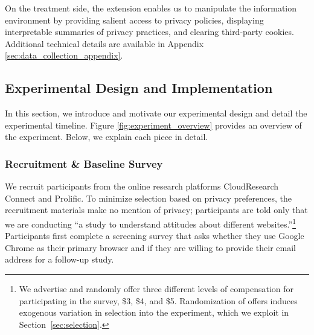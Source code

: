 \documentclass[12pt]{article}
\theoremstyle{definition}
\theoremstyle{remark}
\begin{document}
On the treatment side, the extension enables us to manipulate the information environment by providing salient access to privacy policies, displaying interpretable summaries of privacy practices, and clearing third-party cookies. Additional technical details are available in Appendix \ref{sec:data_collection_appendix}.

\subsection{Experimental Design and Implementation}

In this section, we introduce and motivate our experimental design and detail the experimental timeline. Figure \ref{fig:experiment_overview} provides an overview of the experiment. Below, we explain each piece in detail.

\subsubsection{Recruitment \& Baseline Survey}\label{subsec:recruitment}

We recruit participants from the online research platforms CloudResearch Connect and Prolific. To minimize selection based on privacy preferences, the recruitment materials make no mention of privacy; participants are told only that we are conducting ``a study to understand attitudes about different websites.''\footnote{We advertise and randomly offer three different levels of compensation for participating in the survey, \$3, \$4, and \$5. Randomization of offers induces exogenous variation in selection into the experiment, which we exploit in Section~\ref{sec:selection}.} Participants first complete a screening survey that asks whether they use Google Chrome as their primary browser and if they are willing to provide their email address for a follow-up study.
\end{document}

